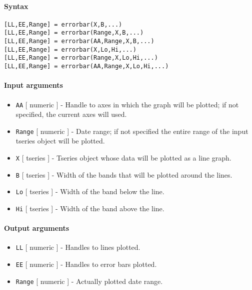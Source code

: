 


	\paragraph{Syntax}\label{syntax}

\begin{verbatim}
[LL,EE,Range] = errorbar(X,B,...)
[LL,EE,Range] = errorbar(Range,X,B,...)
[LL,EE,Range] = errorbar(AA,Range,X,B,...)
[LL,EE,Range] = errorbar(X,Lo,Hi,...)
[LL,EE,Range] = errorbar(Range,X,Lo,Hi,...)
[LL,EE,Range] = errorbar(AA,Range,X,Lo,Hi,...)
\end{verbatim}

\paragraph{Input arguments}\label{input-arguments}

\begin{itemize}
\item
  \texttt{AA} {[} numeric {]} - Handle to axes in which the graph will
  be plotted; if not specified, the current axes will used.
\item
  \texttt{Range} {[} numeric {]} - Date range; if not specified the
  entire range of the input tseries object will be plotted.
\item
  \texttt{X} {[} tseries {]} - Tseries object whose data will be plotted
  as a line graph.
\item
  \texttt{B} {[} tseries {]} - Width of the bands that will be plotted
  around the lines.
\item
  \texttt{Lo} {[} tseries {]} - Width of the band below the line.
\item
  \texttt{Hi} {[} tseries {]} - Width of the band above the line.
\end{itemize}

\paragraph{Output arguments}\label{output-arguments}

\begin{itemize}
\item
  \texttt{LL} {[} numeric {]} - Handles to lines plotted.
\item
  \texttt{EE} {[} numeric {]} - Handles to error bars plotted.
\item
  \texttt{Range} {[} numeric {]} - Actually plotted date range.
\end{itemize}

